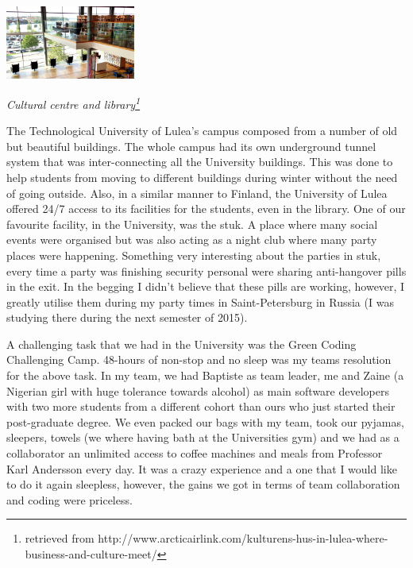 \documentclass[10pt,a4paper]{article} %
\begin{document}
\begin{multicols}{3}
\begin{center}
	\includegraphics[width=0.32\textwidth]{media/cultural_centre_lulea.jpg}
	\par\textit{Cultural centre and library\footnote{retrieved from http://www.arcticairlink.com/kulturens-hus-in-lulea-where-business-and-culture-meet/}}
\end{center}


The Technological University of Lulea's campus composed from a number of old but 
beautiful buildings. 
The whole campus had its own underground tunnel system that was inter-connecting 
all the University buildings. 
This was done to help students from moving to different buildings during winter 
without the need of going outside. 
Also, in a similar manner to Finland, the University of Lulea offered 24/7 access 
to its facilities for the students, even in the library. 
One of our favourite facility, in the University, was the {\sc stuk}. 
A place where many social events were organised but was also acting as a night 
club where many party places were happening.
Something very interesting about the parties in {\sc stuk}, every time a party 
was finishing security personal were sharing anti-hangover pills in the exit. 
In the begging I didn't believe that these pills are working, however, I greatly 
utilise them during my party times in Saint-Petersburg in Russia (I was 
studying there during the next semester of 2015).


A challenging task that we had in the University was the Green Coding Challenging 
Camp.
48-hours of non-stop and no sleep was my teams resolution for the above task. 
In my team, we had Baptiste as team leader, me and Zaine (a Nigerian girl with huge 
tolerance towards alcohol) as main software developers with two more students 
from a different cohort than ours who just started their post-graduate degree.  
We even packed our bags with my team, took our pyjamas, sleepers, towels 
(we where having bath at the Universities gym) and we had as a collaborator an 
unlimited access to coffee machines and meals from Professor Karl Andersson every 
day. 
It was a crazy experience and a one that I would like to do it again sleepless, 
however, the gains we got in terms of team collaboration and coding were 
priceless.



\end{multicols}
\end{document}

